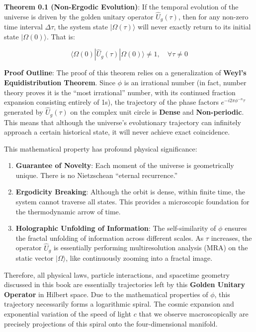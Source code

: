 \textbf{Theorem 0.1 (Non-Ergodic Evolution)}:
If the temporal evolution of the universe is driven by the golden unitary operator $\hat{U}_g(\tau)$, then for any non-zero time interval $\Delta \tau$, the system state $|\Omega(\tau)\rangle$ will never exactly return to its initial state $|\Omega(0)\rangle$. That is:

\[\langle \Omega(0) | \hat{U}_g(\tau) | \Omega(0) \rangle \neq 1, \quad \forall \tau \neq 0\]

\textbf{Proof Outline}:
The proof of this theorem relies on a generalization of \textbf{Weyl's Equidistribution Theorem}. Since $\phi$ is an irrational number (in fact, number theory proves it is the ``most irrational'' number, with its continued fraction expansion consisting entirely of 1s), the trajectory of the phase factors $e^{-i 2\pi \phi^{-n} \tau}$ generated by $\hat{U}_g(\tau)$ on the complex unit circle is \textbf{Dense} and \textbf{Non-periodic}. This means that although the universe's evolutionary trajectory can infinitely approach a certain historical state, it will never achieve exact coincidence.

This mathematical property has profound physical significance:

\begin{enumerate}
\item \textbf{Guarantee of Novelty}: Each moment of the universe is geometrically unique. There is no Nietzschean ``eternal recurrence.''
\item \textbf{Ergodicity Breaking}: Although the orbit is dense, within finite time, the system cannot traverse all states. This provides a microscopic foundation for the thermodynamic arrow of time.
\item \textbf{Holographic Unfolding of Information}: The self-similarity of $\phi$ ensures the fractal unfolding of information across different scales. As $\tau$ increases, the operator $\hat{U}_g$ is essentially performing multiresolution analysis (MRA) on the static vector $|\Omega\rangle$, like continuously zooming into a fractal image.
\end{enumerate}

Therefore, all physical laws, particle interactions, and spacetime geometry discussed in this book are essentially trajectories left by this \textbf{Golden Unitary Operator} in Hilbert space. Due to the mathematical properties of $\phi$, this trajectory necessarily forms a logarithmic spiral. The cosmic expansion and exponential variation of the speed of light $c$ that we observe macroscopically are precisely projections of this spiral onto the four-dimensional manifold.


